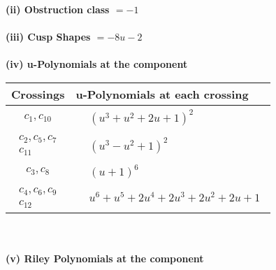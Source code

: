 \documentclass[1p]{elsarticle_modified}
\theoremstyle{definition}
\begin{document}
\flushleft \textbf{(ii) Obstruction class $= -1$}\\~\\
\flushleft \textbf{(iii) Cusp Shapes $= -8 u-2$}\\~\\
\newpage\renewcommand{\arraystretch}{1}
\flushleft \textbf{(iv) u-Polynomials at the component}\newline \\
\begin{tabular}{m{50pt}|m{274pt}}
Crossings & \hspace{64pt}u-Polynomials at each crossing \\
\hline $$\begin{aligned}c_{1},c_{10}\end{aligned}$$&$\begin{aligned}
&(u^3+u^2+2 u+1)^2
\end{aligned}$\\
\hline $$\begin{aligned}c_{2},c_{5},c_{7}\\c_{11}\end{aligned}$$&$\begin{aligned}
&(u^3- u^2+1)^2
\end{aligned}$\\
\hline $$\begin{aligned}c_{3},c_{8}\end{aligned}$$&$\begin{aligned}
&(u+1)^6
\end{aligned}$\\
\hline $$\begin{aligned}c_{4},c_{6},c_{9}\\c_{12}\end{aligned}$$&$\begin{aligned}
&u^6+u^5+2 u^4+2 u^3+2 u^2+2 u+1
\end{aligned}$\\
\hline
\end{tabular}\\~\\
\newpage\renewcommand{\arraystretch}{1}
\flushleft \textbf{(v) Riley Polynomials at the component}\newline \\
\end{document}
